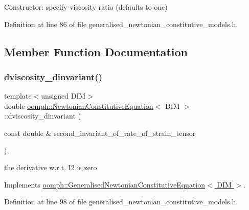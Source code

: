 Constructor\+: specify viscosity ratio (defaults to one) 



Definition at line 86 of file generalised\+\_\+newtonian\+\_\+constitutive\+\_\+models.\+h.



\subsection{Member Function Documentation}
\mbox{\label{classoomph_1_1NewtonianConstitutiveEquation_aa4160d3707e40c7478047f5800733225}} 
\subsubsection{\texorpdfstring{dviscosity\+\_\+dinvariant()}{dviscosity\_dinvariant()}}
{\footnotesize\ttfamily template$<$unsigned D\+IM$>$ \\
double \hyperlink{classoomph_1_1NewtonianConstitutiveEquation}{oomph\+::\+Newtonian\+Constitutive\+Equation}$<$ D\+IM $>$\+::dviscosity\+\_\+dinvariant (\begin{DoxyParamCaption}\item[{const double \&}]{second\+\_\+invariant\+\_\+of\+\_\+rate\+\_\+of\+\_\+strain\+\_\+tensor }\end{DoxyParamCaption})\hspace{0.3cm}{\ttfamily [inline]}, {\ttfamily [virtual]}}



the derivative w.\+r.\+t. I2 is zero 



Implements \hyperlink{classoomph_1_1GeneralisedNewtonianConstitutiveEquation_ad0164e6ca57cc986048346e12c4d353a}{oomph\+::\+Generalised\+Newtonian\+Constitutive\+Equation$<$ D\+I\+M $>$}.



Definition at line 98 of file generalised\+\_\+newtonian\+\_\+constitutive\+\_\+models.\+h.

\mbox{\label{classoomph_1_1NewtonianConstitutiveEquation_a28c8373040e25ce4027be08dd49aa444}} 
